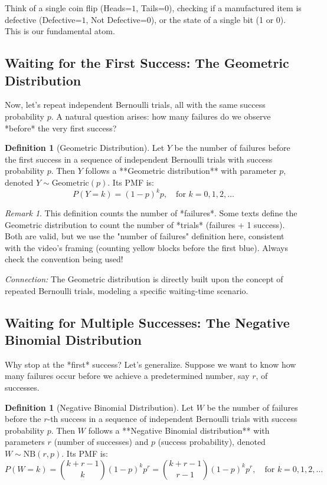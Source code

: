 \documentclass[11pt, letterpaper]{article}
\theoremstyle{definition}
\newtheorem{definition}[theorem]{Definition}
\theoremstyle{remark}
\newtheorem{remark}[theorem]{Remark}
\begin{document}
Think of a single coin flip (Heads=$1$, Tails=$0$), checking if a manufactured item is defective (Defective=$1$, Not Defective=$0$), or the state of a single bit (1 or 0). This is our fundamental atom.

\subsection{Waiting for the First Success: The Geometric Distribution}

Now, let's repeat independent Bernoulli trials, all with the same success probability $p$. A natural question arises: how many failures do we observe *before* the very first success?

\begin{definition}[Geometric Distribution]
Let $Y$ be the number of failures before the first success in a sequence of independent Bernoulli trials with success probability $p$. Then $Y$ follows a **Geometric distribution** with parameter $p$, denoted $Y \sim \text{Geometric}(p)$. Its PMF is:
$$ P(Y=k) = (1-p)^k p, \quad \text{for } k = 0, 1, 2, \dots $$
\end{definition}

\begin{remark}
This definition counts the number of *failures*. Some texts define the Geometric distribution to count the number of *trials* (failures + 1 success). Both are valid, but we use the "number of failures" definition here, consistent with the video's framing (counting yellow blocks before the first blue). Always check the convention being used!
\end{remark}

\textit{Connection:} The Geometric distribution is directly built upon the concept of repeated Bernoulli trials, modeling a specific waiting-time scenario.

\subsection{Waiting for Multiple Successes: The Negative Binomial Distribution}

Why stop at the *first* success? Let's generalize. Suppose we want to know how many failures occur before we achieve a predetermined number, say $r$, of successes.

\begin{definition}[Negative Binomial Distribution]
Let $W$ be the number of failures before the $r$-th success in a sequence of independent Bernoulli trials with success probability $p$. Then $W$ follows a **Negative Binomial distribution** with parameters $r$ (number of successes) and $p$ (success probability), denoted $W \sim \text{NB}(r, p)$. Its PMF is:
$$ P(W=k) = \binom{k+r-1}{k} (1-p)^k p^r = \binom{k+r-1}{r-1} (1-p)^k p^r, \quad \text{for } k = 0, 1, 2, \dots $$
\end{definition}
\end{document}
